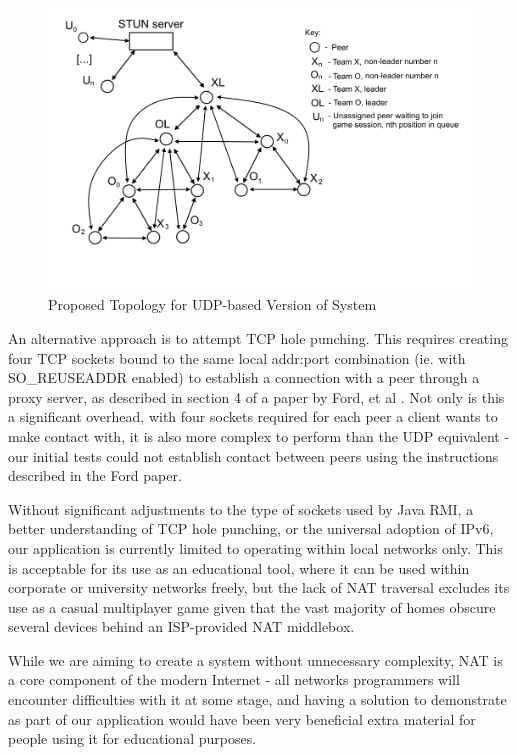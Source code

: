 \documentclass[conference]{IEEEtran}
\begin{document}
\begin{figure}[h]
	\includegraphics[width=\linewidth]{images/p2p-topology-3point.png}
	\caption{Proposed Topology for UDP-based Version of System}
	\label{fig:topology2}
\end{figure}

An alternative approach is to attempt TCP hole punching. This requires creating four TCP sockets bound to the same local addr:port combination (ie. with SO\_REUSEADDR enabled) to establish a connection with a peer through a proxy server, as described in section 4 of a paper by Ford, et al \cite{ford_srisuresh_kegel_2005}. Not only is this a significant overhead, with four sockets required for each peer a client wants to make contact with, it is also more complex to perform than the UDP equivalent - our initial tests could not establish contact between peers using the instructions described in the Ford paper.

Without significant adjustments to the type of sockets used by Java RMI, a better understanding of TCP hole punching, or the universal adoption of IPv6, our application is currently limited to operating within local networks only. This is acceptable for its use as an educational tool, where it can be used within corporate or university networks freely, but the lack of NAT traversal excludes its use as a casual multiplayer game given that the vast majority of homes obscure several devices behind an ISP-provided NAT middlebox.

While we are aiming to create a system without unnecessary complexity, NAT is a core component of the modern Internet - all networks programmers will encounter difficulties with it at some stage, and having a solution to demonstrate as part of our application would have been very beneficial extra material for people using it for educational purposes.
\end{document}

